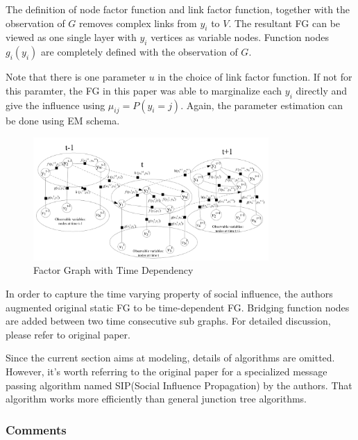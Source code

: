 \documentclass[11pt,a4paper]{article}
\begin{document}
The definition of node factor function and link factor function, together 
with the observation of $G$ removes complex links from $y_i$ to $V$. The 
resultant FG can be viewed as one single layer with $y_i$ vertices 
as variable nodes. Function nodes $g_i(y_i)$ are completely defined 
with the observation of $G$. 

Note that there is one parameter $u$ in the choice of 
link factor function. If not for this paramter, the FG in this paper
was able to marginalize each $y_i$ directly and give the influence 
using $\mu_{ij} = P(y_i=j)$. Again, the parameter estimation can be done
using EM schema. 

\begin{figure}[htb]
\centering
	\includegraphics[width=0.8\textwidth]{fig/wang2011-FG-dynamic.png}
	\caption{Factor Graph with Time Dependency}
\end{figure}

In order to capture the time varying property of social influence, the 
authors augmented original static FG to be time-dependent FG. Bridging 
function nodes are added between two time consecutive sub graphs. For 
detailed discussion, please refer to original paper. 

Since the current section aims at modeling, details of algorithms are 
omitted. However, it's worth referring to the original paper for 
a specialized message passing algorithm named SIP(Social Influence 
Propagation) by the authors. That algorithm works more efficiently 
than general junction tree algorithms. 

\subsubsection{Comments}
\end{document}
